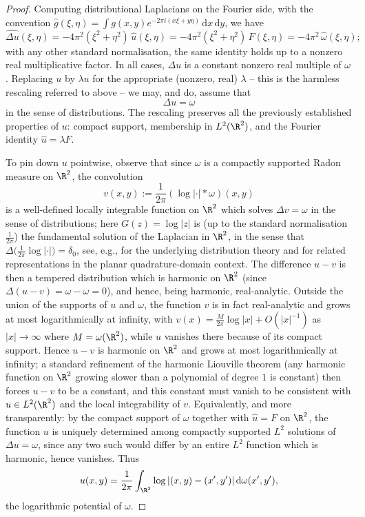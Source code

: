 \begin{proof}
Computing distributional Laplacians on the Fourier side, with the
convention $\widehat g(\xi,\eta)=\int g(x,y)e^{-2\pi i(x\xi+y\eta)}\,
\mathrm{d}x\,\mathrm{d}y$, we have
\[
\widehat{\Delta u}(\xi,\eta) = -4\pi^2(\xi^2+\eta^2)\,\widehat{u}(\xi,\eta)
= -4\pi^2(\xi^2+\eta^2)\,F(\xi,\eta) = -4\pi^2\,\widehat\omega(\xi,\eta);
\]
with any other standard normalisation, the same identity holds up to a
nonzero real multiplicative factor. In all cases, $\Delta u$ is a constant
nonzero real multiple of $\omega$. Replacing $u$ by $\lambda u$ for the
appropriate (nonzero, real) $\lambda$ -- this is the harmless rescaling
referred to above -- we may, and do, assume that
\[
\Delta u = \omega
\]
in the sense of distributions. The rescaling preserves all the previously
established properties of $u$: compact support, membership in $L^2(\R^2)$,
and the Fourier identity $\widehat u = \lambda F$.

To pin down $u$ pointwise, observe that since $\omega$ is a compactly
supported Radon measure on $\R^2$, the convolution
\[
v(x,y) := \frac{1}{2\pi}(\log|\cdot|*\omega)(x,y)
\]
is a well-defined locally integrable function on $\R^2$ which solves
$\Delta v = \omega$ in the sense of distributions; here $G(z)=\log|z|$ is
(up to the standard normalisation $\tfrac{1}{2\pi}$) the fundamental solution
of the Laplacian in $\R^2$, in the sense that
$\Delta\bigl(\tfrac{1}{2\pi}\log|\cdot|\bigr)=\delta_0$, see, e.g.,
\cite{Hormander} for the underlying distribution theory and
\cite{Aharonov-Schiffer-Zalcman} for related representations in the planar
quadrature-domain context.
The difference $u-v$ is then a tempered
distribution which is harmonic on $\R^2$ (since
$\Delta(u-v)=\omega-\omega=0$), and hence, being harmonic, real-analytic.
Outside the union of the supports of $u$ and $\omega$, the function $v$ is
in fact real-analytic and grows at most logarithmically at infinity, with
$v(x)=\frac{M}{2\pi}\log|x|+O(|x|^{-1})$ as $|x|\to\infty$ where
$M=\omega(\R^2)$, while $u$ vanishes there because of its compact support.
Hence $u-v$ is harmonic on $\R^2$ and grows at most logarithmically at
infinity; a standard refinement of the harmonic Liouville theorem (any
harmonic function on $\R^2$ growing slower than a polynomial of degree $1$
is constant) then forces $u-v$ to be a constant, and this constant must
vanish to be consistent with $u\in L^2(\R^2)$ and the local integrability
of $v$. Equivalently, and more transparently: by the compact support of
$\omega$ together with $\widehat u = F$ on $\R^2$, the function $u$ is
uniquely determined among compactly supported $L^2$ solutions of
$\Delta u = \omega$, since any two such would differ by an entire $L^2$
function which is harmonic, hence vanishes. Thus
\[
u(x,y)=\frac{1}{2\pi}\int_{\R^2}\log|(x,y)-(x',y')|\,\mathrm{d}\omega(x',y'),
\]
the logarithmic potential of $\omega$.


\end{proof}
